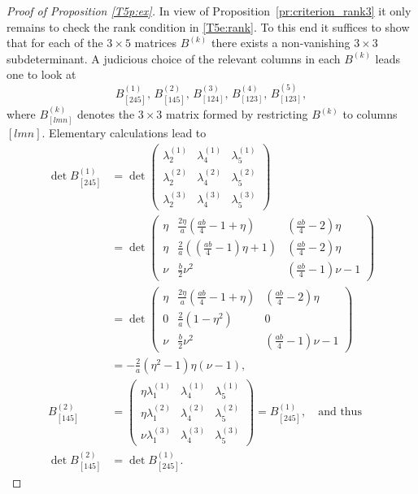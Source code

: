\documentclass[10pt,a4paper]{amsart}
\begin{document}
\begin{proof}[Proof of Proposition \ref{T5p:ex}]
In view of Proposition~\ref{pr:criterion_rank3} it only
  remains to check the rank condition in \eqref{T5e:rank}. To this end it suffices to show that for each of the $3\times 5$ matrices $B^{(k)}$ there exists a non-vanishing $3\times 3$ subdeterminant. A judicious choice of the relevant columns in each $B^{(k)}$ leads one to look at 
$$
B^{(1)}_{[2 4 5]},\,B^{(2)}_{[1 4 5]},\,
 B^{(3)}_{[124]},\,
B^{(4)}_{[1 2 3]},\,B^{(5)}_{[1 2 3]},
$$
where $B^{(k)}_{[l m n]}$ denotes the $3\times 3$ matrix formed by restricting $B^{(k)}$ to columns $[l m n ]$. 
Elementary calculations lead to
\begin{align*}
\det B^{(1)}_{[2 4 5]} 
&
 = \det \begin{pmatrix} \lambda^{(1)}_2   &  \lambda^{(1)}_4 & \lambda^{(1)}_5 \\
  \lambda^{(2)}_2 &  \lambda^{(2)}_4 & \lambda^{(2)}_5\\
   \lambda^{(3)}_2   &  \lambda^{(3)}_4 & \lambda^{(3)}_5
\end{pmatrix}
\\
 &= \det \begin{pmatrix}
	\eta &\tfrac{2\eta}{a}\left(\tfrac{ab}{4}-1+\eta\right)&\left(\frac{ab}{4}-2\right)\eta\\
    \eta &\tfrac{2}{a}\left((\tfrac{ab}{4}-1)\eta+1\right)&\left(\frac{ab}{4}-2\right)\eta\\
    \nu &\tfrac{b}{2}\nu^2&\left(\frac{ab}{4}-1\right)\nu-1
\end{pmatrix}\\
&=\det\begin{pmatrix}
	\eta &\tfrac{2\eta}{a}\left(\tfrac{ab}{4}-1+\eta\right)&\left(\frac{ab}{4}-2\right)\eta\\
    0 &\tfrac{2}{a}\left(1-\eta^2\right)&0\\
    \nu &\tfrac{b}{2}\nu^2&\left(\frac{ab}{4}-1\right)\nu-1
\end{pmatrix}\\
&=-\tfrac{2}{a}(\eta^2-1)\eta(\nu-1),\\
  B^{(2)}_{[1 4 5]} 
 & =
 \begin{pmatrix} \eta \lambda^{(1)}_1 &  \lambda^{(1)}_4 & \lambda^{(1)}_5 \\
\eta  \lambda^{(2)}_1 &  \lambda^{(2)}_4 & \lambda^{(2)}_5\\
 \nu   \lambda^{(3)}_1 &   \lambda^{(3)}_4 & \lambda^{(3)}_5
\end{pmatrix}  
=  B^{(1)}_{[245]},  \quad  \text{and thus}  \\
\det   B^{(2)}_{[1 4 5]} & = \det  B^{(1)}_{[245]}.
 \end{align*}
 


\end{proof}
\end{document}
